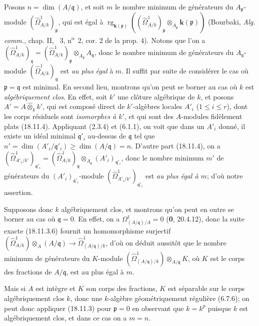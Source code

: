 Posons $n=\dim(A/\mathfrak q)$, et soit $m$ le nombre minimum de générateurs du $A_{\mathfrak p}$-module $(\hat{\Omega}^1_{A/k})_{\mathfrak p}$, qui est égal à $\operatorname{rg}_{\mathbf{k}(\mathfrak p)}((\hat{\Omega}^1_{A/k})_{\mathfrak p}\otimes_{A_{\mathfrak p}}\boldsymbol{k}(\mathfrak p))$ (Bourbaki, \emph{Alg. comm.}, chap. II, \textsection~3, n\textsuperscript{o}~2, cor. 2 de la prop. 4). Notons que l'on a $(\hat{\Omega}^1_{A/k})_{\mathfrak q}=(\hat{\Omega}^1_{A/k})_{\mathfrak p}\otimes_{A_{\mathfrak p}}A_{\mathfrak q}$, donc le nombre minimum de générateurs du $A_{\mathfrak q}$-module $(\hat{\Omega}^1_{A/k})_{\mathfrak q}$ est \emph{au plus égal} à $m$. Il suffit par suite de considérer le cas où $\mathfrak p=\mathfrak q$ est minimal. En second lieu, montrons qu'on peut se borner au cas où $k$ est \emph{algébriquement clos}. En effet, soit $k'$ une clôture algébrique de $k$, et posons $A'=A\widehat{\otimes}_k k'$, qui est composé direct de $k'$-algèbres locales $A'_i$ ($1\leq i\leq r$), dont les corps résiduels sont \emph{isomorphes à $k'$}, et qui sont des $A$-modules fidèlement plats (18.11.4). Appliquant (2.3.4) et (6.1.1), on voit que dans un $A'_i$ donné, il existe un idéal minimal $\mathfrak q'_i$ au-dessus de $\mathfrak q$ tel que $n'=\dim(A'_i/\mathfrak q'_i)\geq\dim(A/\mathfrak q)=n$. D'autre part (18.11.4), on a $(\hat{\Omega}^1_{A'_i/k'})_{\mathfrak q'_i}=(\hat{\Omega}^1_{A/k})_{\mathfrak q}\otimes_{A_{\mathfrak q}}(A'_i)_{\mathfrak q'_i}$, donc le nombre minimum $m'$ de générateurs du $(A'_i)_{\mathfrak q'_i}$-module $(\hat{\Omega}^1_{A'_i/k'})_{\mathfrak q'_i}$ est \emph{au plus égal à $m$}; d'où notre assertion.

Supposons donc $k$ algébriquement clos, et montrons qu'on peut en outre se borner au cas où $\mathfrak q=0$. En effet, on a $\Omega^1_{(A/\mathfrak q)/A}=0$ (\textbf{0}, 20.4.12), donc la suite exacte (18.11.3.6) fournit un homomorphisme surjectif $(\hat{\Omega}^1_{A/k})\otimes_A(A/\mathfrak q)\to\hat{\Omega}^1_{(A/\mathfrak q)/k}$, d'où on déduit aussitôt que le nombre minimum de générateurs du $K$-module $(\hat{\Omega}^1_{(A/\mathfrak q)/k})\otimes_{A/\mathfrak q}K$, où $K$ est le corps des fractions de $A/\mathfrak q$, est au plus égal à $m$.

Mais si $A$ est intègre et $K$ son corps des fractions, $K$ est séparable sur le corps algébriquement clos $k$, donc une $k$-algèbre géométriquement régulière (6.7.6); on peut donc appliquer (18.11.3) pour $\mathfrak p=0$ en observant que $k=k^p$ puisque $k$ est algébriquement clos, et dans ce cas on a $m=n$.


